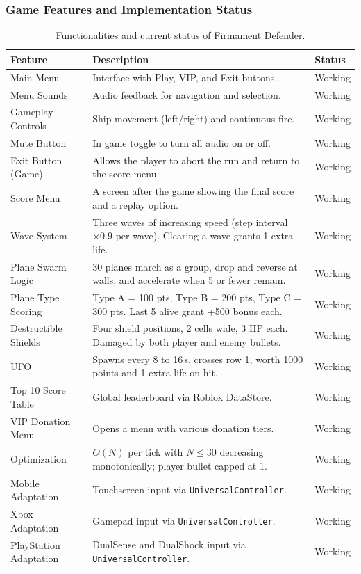 \documentclass[12pt,letterpaper]{article}
\begin{document}
\subsubsection{Game Features and Implementation Status}

\begin{table}[H]
\centering
\begin{tabular}{|p{4cm}|p{8cm}|p{2.5cm}|}
\hline
\textbf{Feature} & \textbf{Description} & \textbf{Status} \\
\hline
Main Menu & Interface with Play, VIP, and Exit buttons. & Working \\
\hline
Menu Sounds & Audio feedback for navigation and selection. & Working \\
\hline
Gameplay Controls & Ship movement (left/right) and continuous fire. & Working \\
\hline
Mute Button & In game toggle to turn all audio on or off. & Working \\
\hline
Exit Button (Game) & Allows the player to abort the run and return to the score menu. & Working \\
\hline
Score Menu & A screen after the game showing the final score and a replay option. & Working \\
\hline
Wave System & Three waves of increasing speed (step interval $\times 0.9$ per wave). Clearing a wave grants 1 extra life. & Working \\
\hline
Plane Swarm Logic & 30 planes march as a group, drop and reverse at walls, and accelerate when 5 or fewer remain. & Working \\
\hline
Plane Type Scoring & Type A = 100 pts, Type B = 200 pts, Type C = 300 pts. Last 5 alive grant +500 bonus each. & Working \\
\hline
Destructible Shields & Four shield positions, 2 cells wide, 3 HP each. Damaged by both player and enemy bullets. & Working \\
\hline
UFO & Spawns every 8 to 16\,s, crosses row 1, worth 1000 points and 1 extra life on hit. & Working \\
\hline
Top 10 Score Table & Global leaderboard via Roblox DataStore. & Working \\
\hline
VIP Donation Menu & Opens a menu with various donation tiers. & Working \\
\hline
Optimization & $O(N)$ per tick with $N \leq 30$ decreasing monotonically; player bullet capped at 1. & Working \\
\hline
Mobile Adaptation & Touchscreen input via \texttt{UniversalController}. & Working \\
\hline
Xbox Adaptation & Gamepad input via \texttt{UniversalController}. & Working \\
\hline
PlayStation Adaptation & DualSense and DualShock input via \texttt{UniversalController}. & Working \\
\hline
\end{tabular}
\caption{Functionalities and current status of Firmament Defender.}
\end{table}
\end{document}
